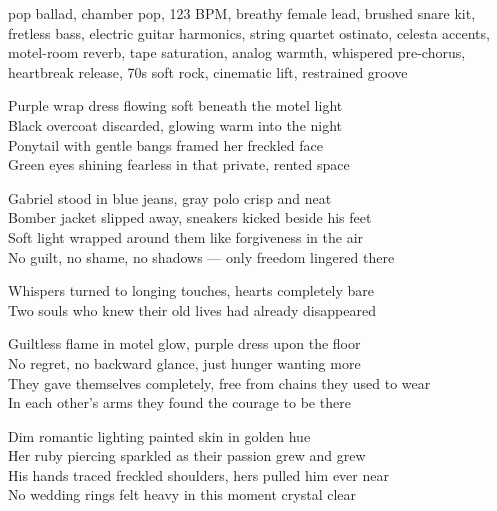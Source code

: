 

\begin{notes}
\end{notes}

\begin{style}
pop ballad, chamber pop, 123 BPM, breathy female lead, brushed snare kit, fretless bass, electric guitar harmonics, string quartet ostinato, celesta accents, motel-room reverb, tape saturation, analog warmth, whispered pre-chorus, heartbreak release, 70s soft rock, cinematic lift, restrained groove
\end{style}

\begin{lyrics}

Purple wrap dress flowing soft beneath the motel light\\
Black overcoat discarded, glowing warm into the night\\
Ponytail with gentle bangs framed her freckled face\\
Green eyes shining fearless in that private, rented space

Gabriel stood in blue jeans, gray polo crisp and neat\\
Bomber jacket slipped away, sneakers kicked beside his feet\\
Soft light wrapped around them like forgiveness in the air\\
No guilt, no shame, no shadows — only freedom lingered there

Whispers turned to longing touches, hearts completely bare\\
Two souls who knew their old lives had already disappeared

Guiltless flame in motel glow, purple dress upon the floor\\
No regret, no backward glance, just hunger wanting more\\
They gave themselves completely, free from chains they used to wear\\
In each other’s arms they found the courage to be there

Dim romantic lighting painted skin in golden hue\\
Her ruby piercing sparkled as their passion grew and grew\\
His hands traced freckled shoulders, hers pulled him ever near\\
No wedding rings felt heavy in this moment crystal clear


\end{lyrics}
